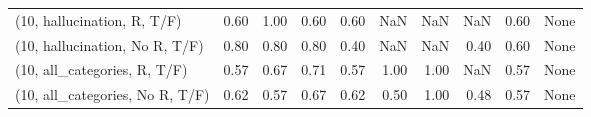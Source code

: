 \begin{table*}[h!]
\begin{adjustbox}{width=2\columnwidth,center}
\begin{tabular}{lrrr|rrr|rrr}
(10, hallucination, R, T/F)           &                      0.60 &                  1.00 &                      0.60 &                          0.60 &                       NaN &                           NaN &                                    NaN &                               0.60 &                                  None \\
(10, hallucination, No R, T/F)        &                      0.80 &                  0.80 &                      0.80 &                          0.40 &                       NaN &                           NaN &                                   0.40 &                               0.60 &                                  None \\
(10, all\_categories, R, T/F)          &                      0.57 &                  0.67 &                      0.71 &                          0.57 &                      1.00 &                          1.00 &                                    NaN &                               0.57 &                                  None \\
(10, all\_categories, No R, T/F)       &                      0.62 &                  0.57 &                      0.67 &                          0.62 &                      0.50 &                          1.00 &                                   0.48 &                               0.57 &                                  None \\




\end{tabular}
\end{adjustbox}
\end{table*}
